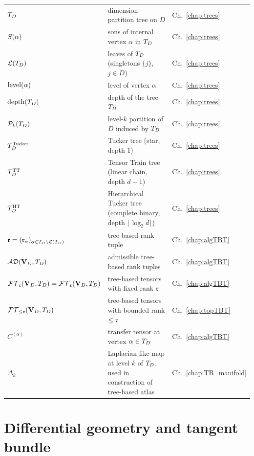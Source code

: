 \begin{tabular}{@{}p{4.5cm}p{7cm}l@{}}
$T_D$ & dimension partition tree on $D$ & Ch.~\ref{chap:trees} \\
$S(\alpha)$ & sons of internal vertex $\alpha$ in $T_D$
    & Ch.~\ref{chap:trees} \\
$\mathcal{L}(T_D)$ & leaves of $T_D$ (singletons $\{j\}$, $j \in D$)
    & Ch.~\ref{chap:trees} \\
$\mathrm{level}(\alpha)$ & level of vertex $\alpha$
    & Ch.~\ref{chap:trees} \\
$\mathrm{depth}(T_D)$ & depth of the tree $T_D$ & Ch.~\ref{chap:trees} \\
$\mathcal{P}_{k}(T_D)$ & level-$k$ partition of $D$ induced by $T_D$
    & Ch.~\ref{chap:trees} \\
$T_D^{\mathrm{Tucker}}$ & Tucker tree (star, depth 1) & Ch.~\ref{chap:trees} \\
$T_D^{\mathrm{TT}}$ & Tensor Train tree (linear chain, depth $d-1$)
    & Ch.~\ref{chap:trees} \\
$T_D^{\mathrm{HT}}$ & Hierarchical Tucker tree (complete binary, depth
    $\lceil\log_2 d\rceil$) & Ch.~\ref{chap:trees} \\
$\mathfrak{r} = (\mathfrak{r}_\alpha)_{\alpha \in T_D \setminus \mathcal{L}(T_D)}$
    & tree-based rank tuple & Ch.~\ref{chap:algTBT} \\
$\mathcal{AD}(\mathbf{V}_D,T_D)$ & admissible tree-based rank tuples & Ch.~\ref{chap:algTBT} \\
$\mathcal{FT}_{\mathfrak{r}}(\mathbf{V}_D,T_D) = \mathcal{FT}_{\mathfrak{r}}(\mathbf{V}_D, T_D)$ & tree-based tensors with fixed
    rank $\mathfrak{r}$ & Ch.~\ref{chap:algTBT} \\
$\mathcal{FT}_{\leq\mathfrak{r}}(\mathbf{V}_D,T_D)$ & tree-based tensors with bounded
    rank $\leq \mathfrak{r}$ & Ch.~\ref{chap:topTBT} \\
$C^{(\alpha)}$ & transfer tensor at vertex $\alpha \in T_D$
    & Ch.~\ref{chap:algTBT} \\
$\Delta_k$ & Laplacian-like map at level $k$ of $T_D$, used in
    construction of tree-based atlas
    & Ch.~\ref{chap:TB_manifold} \\
\end{tabular}

\section*{Differential geometry and tangent bundle}

